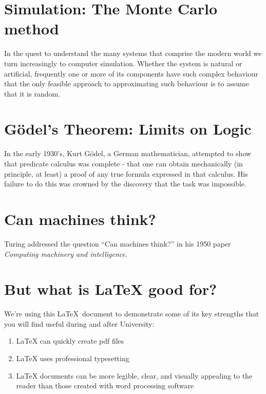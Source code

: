 \documentclass[a4paper]{article}
\begin{document}
\section{Simulation: The Monte Carlo method}
In the quest to understand the many systems that comprise the modern world we turn increasingly to computer simulation. Whether the system is natural or artificial, frequently one or more of its components have such complex behaviour that the only feasible approach to approximating such behaviour is to assume that it is random.

\section{Gödel's Theorem: Limits on Logic}
In the early 1930's, Kurt Gödel, a German mathematician, attempted to show that predicate calculus was complete - that one can obtain mechanically  (in principle, at least) a proof of any true formula expressed in that calculus. His failure to do this was crowned by the discovery that the task was impossible.

\section{Can machines think?}
Turing addressed the question ``Can machines think?'' in his 1950 paper \textit{Computing machinery and intelligence}.

\section{But what is LaTeX good for?}
We're using this \LaTeX\ document to demonstrate some of its key strengths that you will find useful during and after University:

\begin{enumerate} %
\item LaTeX can quickly create pdf files
\item LaTeX uses professional typesetting
\item LaTeX documents can be more legible, clear, and visually appealing to the reader than those created with word processing software
\end{enumerate}
\end{document}
